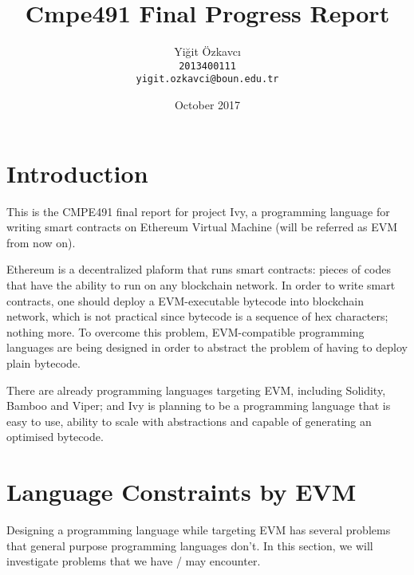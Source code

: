\documentclass{article}
\title{Cmpe491 Final Progress Report}
\author{
  Yiğit Özkavcı \\
  \texttt{2013400111} \\
  \texttt{yigit.ozkavci@boun.edu.tr}
}
\date{October 2017}
\begin{document}

\maketitle

\tableofcontents


\section{Introduction}
\par 
\par This is the CMPE491 final report for project Ivy, a programming language for writing smart contracts on Ethereum Virtual Machine (will be referred as EVM from now on).
\par Ethereum is a decentralized plaform that runs smart contracts: pieces of codes that have the ability to run on any blockchain network. In order to write smart contracts, one should deploy a EVM-executable bytecode into blockchain network, which is not practical since bytecode is a sequence of hex characters; nothing more. To overcome this problem, EVM-compatible programming languages are being designed in order to abstract the problem of having to deploy plain bytecode. 
\par There are already programming languages targeting EVM, including Solidity\cite{solidity}, Bamboo\cite{bamboo} and Viper\cite{viper}; and Ivy is planning to be a programming language that is easy to use, ability to scale with abstractions and capable of generating an optimised bytecode.

\section{Language Constraints by EVM}
Designing a programming language while targeting EVM has several problems that general purpose programming languages don't. In this section, we will investigate problems that we have / may encounter.
\end{document}
